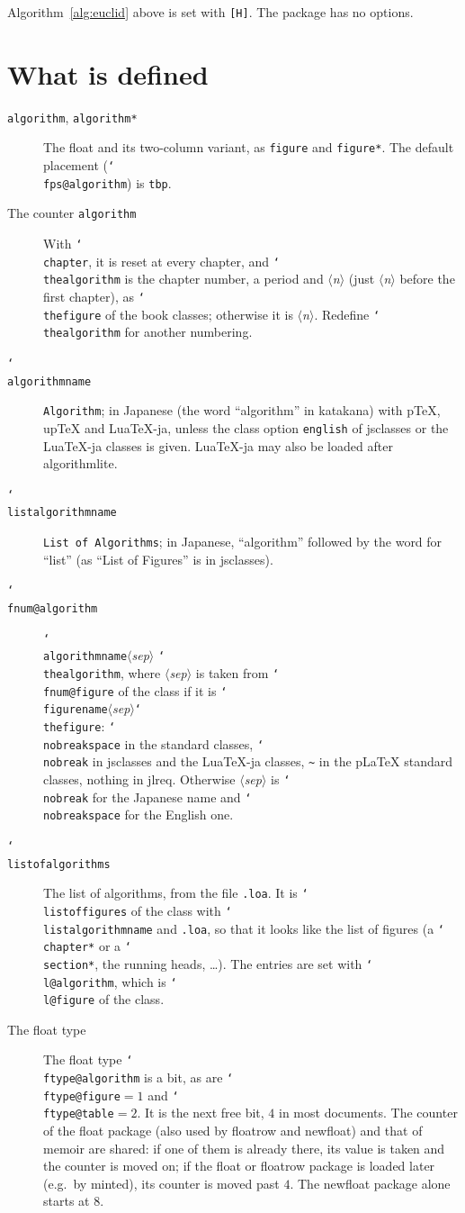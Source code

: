 \documentclass{article}
\newcommand*\cs[1]{\texttt{\char`\\#1}}
\newcommand*\pkg[1]{\textsf{#1}}
\newcommand*\env[1]{\texttt{#1}}
\newcommand*\meta[1]{$\langle$\textit{#1}$\rangle$}
\begin{document}
\noindent
Algorithm~\ref{alg:euclid} above is set with \texttt{[H]}.  The package
has no options.

\section{What is defined}

\begin{description}
\item[\env{algorithm}, \env{algorithm*}] The float and its two-column
  variant, as \env{figure} and \env{figure*}.  The default placement
  (\cs{fps@algorithm}) is \texttt{tbp}.

\item[The counter \texttt{algorithm}] With \cs{chapter}, it is reset
  at every chapter, and \cs{thealgorithm} is the chapter number, a
  period and \meta{n} (just \meta{n} before the first chapter), as
  \cs{thefigure} of the book classes; otherwise it is \meta{n}.  Redefine \cs{thealgorithm} for another numbering.

\item[\cs{algorithmname}] \texttt{Algorithm}; in Japanese (the word
  ``algorithm'' in katakana) with p\TeX, up\TeX{} and Lua\TeX-ja, unless the class
  option \texttt{english} of jsclasses or the Lua\TeX-ja classes is
  given.  Lua\TeX-ja may also be loaded after \pkg{algorithmlite}.

\item[\cs{listalgorithmname}] \texttt{List of Algorithms}; in
  Japanese, ``algorithm'' followed by the word for ``list'' (as
  ``List of Figures'' is in jsclasses).

\item[\cs{fnum@algorithm}] \cs{algorithmname}\meta{sep}%
  \cs{thealgorithm}, where \meta{sep} is taken from \cs{fnum@figure}
  of the class if it is \cs{figurename}\meta{sep}\cs{thefigure}:
  \cs{nobreakspace} in the standard classes, \cs{nobreak} in jsclasses
  and the Lua\TeX-ja classes, \verb|~| in the p\LaTeX{} standard
  classes, nothing in jlreq.  Otherwise \meta{sep} is \cs{nobreak} for
  the Japanese name and \cs{nobreakspace} for the English one.

\item[\cs{listofalgorithms}] The list of algorithms, from the file
  \texttt{.loa}.  It is \cs{listoffigures} of the class with
  \cs{listalgorithmname} and \texttt{.loa}, so that it looks like the
  list of figures (a \cs{chapter*} or a \cs{section*}, the running
  heads, \dots).  The entries are set with \cs{l@algorithm}, which is
  \cs{l@figure} of the class.

\item[The float type] The float type \cs{ftype@algorithm} is a bit,
  as are \cs{ftype@figure}${}=1$ and \cs{ftype@table}${}=2$.  It is
  the next free bit, $4$ in most documents.  The counter of the
  \pkg{float} package (also used by \pkg{floatrow} and \pkg{newfloat})
  and that of memoir are shared: if one of them is already there, its
  value is taken and the counter is moved on; if the \pkg{float} or
  \pkg{floatrow} package is loaded later (e.g.\ by \pkg{minted}), its
  counter is moved past $4$.  The \pkg{newfloat} package alone starts
  at $8$.
\end{description}
\end{document}
